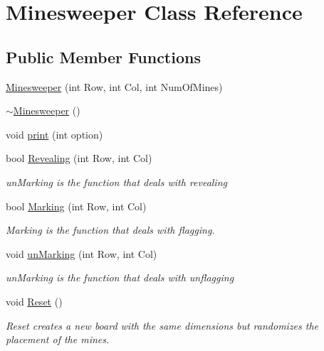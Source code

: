 \hypertarget{class_minesweeper}{}\section{Minesweeper Class Reference}
\label{class_minesweeper}
\subsection*{Public Member Functions}
\begin{DoxyCompactItemize}
\item 
\mbox{\hyperlink{class_minesweeper_a9cb58f108f5f65317c5f7d60ead4e7ec}{Minesweeper}} (int Row, int Col, int Num\+Of\+Mines)
\item 
\mbox{\hyperlink{class_minesweeper_a79c2fcb860d486113e1b557e34dbb67d}{$\sim$\+Minesweeper}} ()
\item 
void \mbox{\hyperlink{class_minesweeper_a8abe207bf94f14d33c10dc88410e6f8c}{print}} (int option)
\item 
bool \mbox{\hyperlink{class_minesweeper_a4da8ec9ff58f3e663eed64ab70d523be}{Revealing}} (int Row, int Col)
\begin{DoxyCompactList}\small\item\em un\+Marking is the function that deals with revealing \end{DoxyCompactList}\item 
bool \mbox{\hyperlink{class_minesweeper_a8ac0c88846a50058ac722e4e9df5afaa}{Marking}} (int Row, int Col)
\begin{DoxyCompactList}\small\item\em Marking is the function that deals with flagging. \end{DoxyCompactList}\item 
void \mbox{\hyperlink{class_minesweeper_ad15ef447b75d2e8775eee43c493d29f4}{un\+Marking}} (int Row, int Col)
\begin{DoxyCompactList}\small\item\em un\+Marking is the function that deals with unflagging \end{DoxyCompactList}\item 
void \mbox{\hyperlink{class_minesweeper_a7bb8b53ca69cd4959e5123a07047702f}{Reset}} ()
\begin{DoxyCompactList}\small\item\em Reset creates a new board with the same dimensions but randomizes the placement of the mines. \end{DoxyCompactList}\item 

\end{DoxyCompactItemize}
